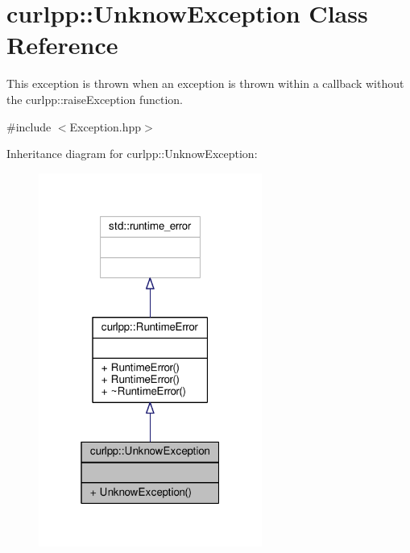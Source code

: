 \hypertarget{classcurlpp_1_1UnknowException}{\section{curlpp\-:\-:Unknow\-Exception Class Reference}
\label{classcurlpp_1_1UnknowException}
}


This exception is thrown when an exception is thrown within a callback without the curlpp\-::raise\-Exception function.  




{\ttfamily \#include $<$Exception.\-hpp$>$}



Inheritance diagram for curlpp\-:\-:Unknow\-Exception\-:\nopagebreak
\begin{figure}[H]
\begin{center}
\leavevmode
\includegraphics[width=208pt]{classcurlpp_1_1UnknowException__inherit__graph}
\end{center}
\end{figure}


